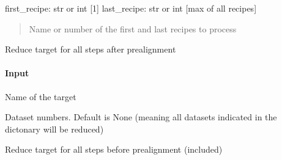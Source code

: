 \documentclass[letterpaper,10pt,english]{sphinxmanual}
\begin{document}
\begin{fulllineitems}
\begin{fulllineitems}
\sphinxAtStartPar
first\_recipe: str or int {[}1{]}
last\_recipe: str or int {[}max of all recipes{]}
\begin{quote}

\sphinxAtStartPar
Name or number of the first and last recipes to process
\end{quote}

\end{fulllineitems}


\begin{fulllineitems}
\label{\detokenize{api/pymusepipe:pymusepipe.target_sample.MusePipeSample.reduce_target_postalign}}
\pysigstartsignatures
{}
\pysigstopsignatures
\sphinxAtStartPar
Reduce target for all steps after pre\sphinxhyphen{}alignment


\paragraph{Input}
\label{\detokenize{api/pymusepipe:id115}}\begin{description}
\sphinxAtStartPar
Name of the target

\sphinxAtStartPar
Dataset numbers. Default is None (meaning all datasets
indicated in the dictonary will be reduced)

\end{description}

\end{fulllineitems}


\begin{fulllineitems}
\label{\detokenize{api/pymusepipe:pymusepipe.target_sample.MusePipeSample.reduce_target_prealign}}
\pysigstartsignatures
{}
\pysigstopsignatures
\sphinxAtStartPar
Reduce target for all steps before pre\sphinxhyphen{}alignment (included)



\end{fulllineitems}
\end{fulllineitems}
\end{document}
